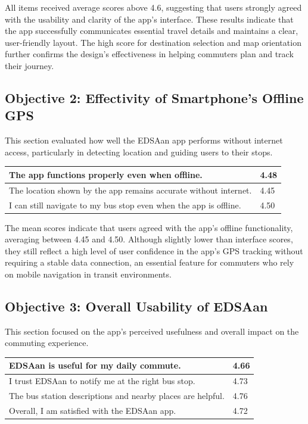 \documentclass[journal]{./IEEE/IEEEtran}
\begin{document}
All items received average scores above 4.6, suggesting that users strongly agreed with the usability and clarity of the app’s interface. These results indicate that the app successfully communicates essential travel details and maintains a clear, user-friendly layout. The high score for destination selection and map orientation further confirms the design’s effectiveness in helping commuters plan and track their journey.

\subsection{Objective 2: Effectivity of Smartphone’s Offline GPS}
This section evaluated how well the EDSAan app performs without internet access, particularly in detecting location and guiding users to their stops.

\begin{center}
\begin{tabular}{ | m{18em} | m{1cm} | } 
  \hline
  The app functions properly even when offline. & 4.48 \\ 
  \hline
  The location shown by the app remains accurate without internet. & 4.45 \\ 
  \hline
  I can still navigate to my bus stop even when the app is offline. & 4.50\\ 
  \hline

\end{tabular}
\end{center}

The mean scores indicate that users agreed with the app’s offline functionality, averaging between 4.45 and 4.50. Although slightly lower than interface scores, they still reflect a high level of user confidence in the app’s GPS tracking without requiring a stable data connection, an essential feature for commuters who rely on mobile navigation in transit environments.

\subsection{Objective 3: Overall Usability of EDSAan}
This section focused on the app’s perceived usefulness and overall impact on the commuting experience.

\begin{center}
\begin{tabular}{ | m{18em} | m{1cm} | } 
  \hline
  EDSAan is useful for my daily commute.	 & 4.66 \\ 
  \hline
  I trust EDSAan to notify me at the right bus stop.	 & 4.73 \\ 
  \hline
  The bus station descriptions and nearby places are helpful.	 & 4.76\\ 
  \hline
  Overall, I am satisfied with the EDSAan app.	 & 4.72\\ 
  \hline

\end{tabular}
\end{center}
\end{document}
